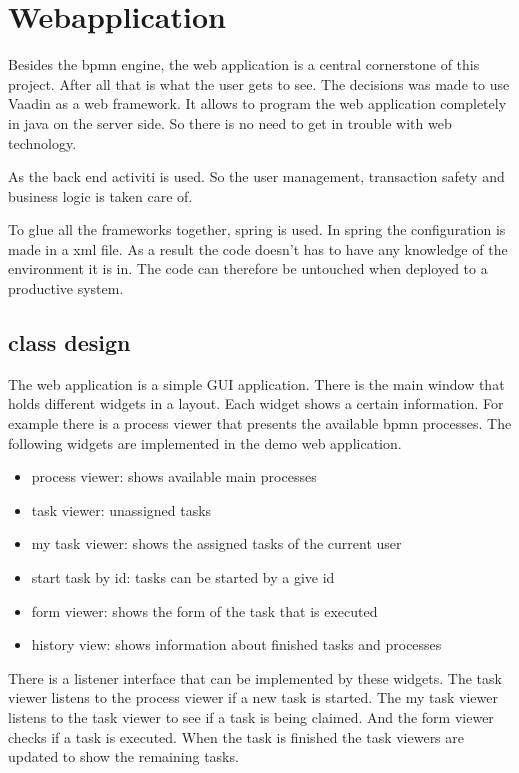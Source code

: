 \documentclass[paper=a4,twoside=false,BCOR=0mm,DIV=calc,fontsize=12pt]{scrartcl}
\begin{document}
\section{Webapplication}
Besides the bpmn engine, the web application is a central cornerstone of this project. After all that is what the user gets to see.
The decisions was made to use Vaadin as a web framework. It allows to program the web application completely in java on the server side. So there is
no need to get in trouble with web technology.

As the back end activiti is used. So the user management, transaction safety and business logic is taken care of.

To glue all the frameworks together, spring is used. In spring the configuration is made in a xml file. As a result the code doesn't has to have any 
knowledge of the environment it is in. The code can therefore be untouched when deployed to a productive system.


\subsection{class design}
The web application is a simple GUI application. There is the main window that holds different widgets in a layout. Each widget shows a certain
information. For example there is a process viewer that presents the available bpmn processes. 
The following widgets are implemented in the demo web application.

\begin{itemize}
 \item process viewer: shows available main processes
 \item task viewer: unassigned tasks
 \item my task viewer: shows the assigned tasks of the current user
 \item start task by id: tasks can be started by a give id
 \item form viewer: shows the form of the task that is executed
 \item history view: shows information about finished tasks and processes
\end{itemize}

There is a listener interface that can be implemented by these widgets. The task viewer listens to the process viewer if a new task is started. The
my task viewer listens to the task viewer to see if a task is being claimed. And the form viewer checks if a task is executed. When the task is
finished the task viewers are updated to show the remaining tasks.
\end{document}
